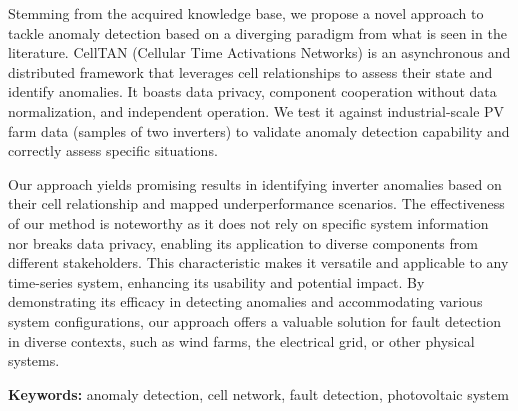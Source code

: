 Stemming from the acquired knowledge base, we propose a novel approach to tackle anomaly detection based on a diverging paradigm from what is seen in the literature. CellTAN (Cellular Time Activations Networks) is an asynchronous and distributed framework that leverages cell relationships to assess their state and identify anomalies. It boasts data privacy, component cooperation without data normalization, and independent operation.
We test it against industrial-scale PV farm data (samples of two inverters) to validate anomaly detection capability and correctly assess specific situations.

Our approach yields promising results in identifying inverter anomalies based on their cell relationship and mapped underperformance scenarios. The effectiveness of our method is noteworthy as it does not rely on specific system information nor breaks data privacy, enabling its application to diverse components from different stakeholders. This characteristic makes it versatile and applicable to any time-series system, enhancing its usability and potential impact. By demonstrating its efficacy in detecting anomalies and accommodating various system configurations, our approach offers a valuable solution for fault detection in diverse contexts, such as wind farms, the electrical grid, or other physical systems.


\bigskip

\textbf{Keywords:} anomaly detection, cell network, fault detection, photovoltaic system
